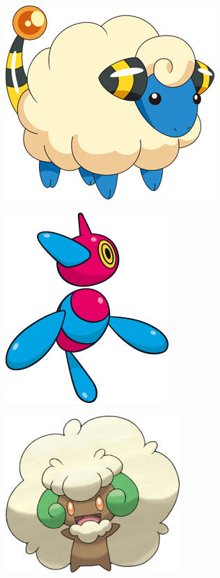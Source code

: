 \begin{minipage}{0.3\textwidth}
\includegraphics[scale = 0.42]{../Images/Watwat.png}
\end{minipage}
\begin{minipage}{0.36\textwidth}\centering
\includegraphics[scale = 0.42]{../Images/PorygonZ.png}
\end{minipage}
\begin{minipage}{0.29\textwidth}
\includegraphics[scale = 0.42]{../Images/Farfaduvet.png}
\end{minipage}